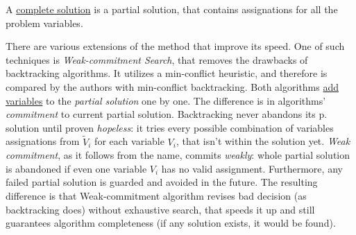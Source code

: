 \documentclass[../ThesisDoc]{subfiles}
\begin{document}
\medskip\noindent
A \underline{complete solution} is a partial solution,
that contains assignations for all the problem variables.

\bigskip
There are various extensions of the method that improve its speed.
One of such techniques is \emph{Weak-commitment Search}\cite{Weak-commitment},
that removes the drawbacks of backtracking algorithms. It utilizes a min-conflict
heuristic, and therefore is compared by the authors with min-conflict backtracking.
Both algorithms \underline{add variables} to the \emph{partial solution} one by one.
The difference is in algorithms' \emph{commitment} to current partial solution.
Backtracking never abandons its p. solution until proven \emph{hopeless}:
it tries every possible combination of variables assignations from ${\tilde V}_i$
for each variable $V_i$, that isn't within the solution yet.
\emph{Weak commitment}, as it follows from the name, commits \emph{weakly}:
whole partial solution is abandoned if even one variable $V_i$ has no valid
assignment. Furthermore, any failed partial solution is guarded and avoided in
the future. The resulting difference is that Weak-commitment algorithm revises
bad decision (as backtracking does) without exhaustive search, that speeds it up
and still guarantees algorithm completeness (if any solution exists, it would be found).
\end{document}
